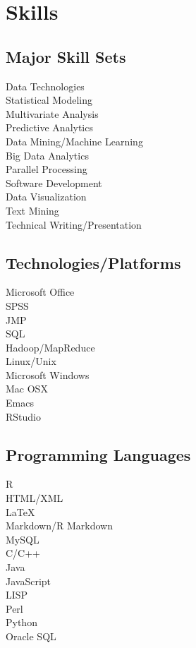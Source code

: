 \documentclass[letterpaper]{deedy-resume} %
\begin{document}
\begin{minipage}[t]{0.35\textwidth}

\section{Skills}
\subsection{Major Skill Sets}
Data Technologies\\
Statistical Modeling\\
Multivariate Analysis\\
Predictive Analytics\\
Data Mining/Machine Learning\\
Big Data Analytics\\
Parallel Processing\\
Software Development\\
Data Visualization\\
Text Mining\\
Technical Writing/Presentation

\sectionspace %

\subsection{Technologies/Platforms}
Microsoft Office\\
SPSS\\
JMP\\
SQL\\
Hadoop/MapReduce\\
Linux/Unix\\
Microsoft Windows\\
Mac OSX\\
Emacs\\
RStudio\\

\sectionspace %

\subsection{Programming Languages}
R\\
HTML/XML\\
\LaTeX\\
Markdown/R Markdown\\
MySQL\\
\sectionspace
{}
C/C++\\
Java\\
JavaScript\\
LISP\\
Perl\\
Python\\
Oracle SQL\\



\end{minipage}
\end{document}
